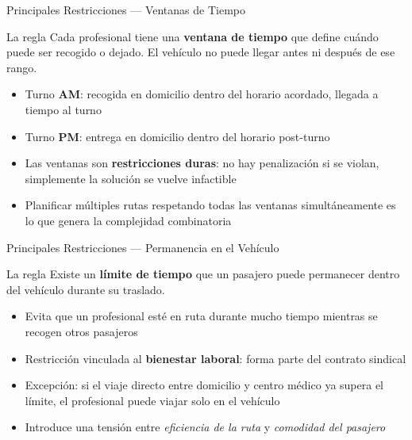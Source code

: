 \documentclass[10pt, aspectratio=169]{beamer}
\begin{document}
\begin{frame}{Principales Restricciones — Ventanas de Tiempo}

  \begin{block}{La regla}
    Cada profesional tiene una \textbf{ventana de tiempo} que define cuándo puede ser recogido o dejado. El vehículo no puede llegar antes ni después de ese rango.
  \end{block}

  \vspace{10pt}
  \begin{itemize}\setlength\itemsep{10pt}
    \item Turno \textcolor{verdeok}{\bfseries AM}: recogida en domicilio dentro del horario acordado, llegada a tiempo al turno
    \item Turno \textcolor{rojono}{\bfseries PM}: entrega en domicilio dentro del horario post-turno
    \item Las ventanas son \textbf{restricciones duras}: no hay penalización si se violan, simplemente la solución se vuelve infactible
    \item Planificar múltiples rutas respetando todas las ventanas simultáneamente es lo que genera la complejidad combinatoria
  \end{itemize}

\end{frame}

\begin{frame}{Principales Restricciones — Permanencia en el Vehículo}

  \begin{block}{La regla}
    Existe un \textbf{límite de tiempo} que un pasajero puede permanecer dentro del vehículo durante su traslado.
  \end{block}

  \vspace{10pt}
  \begin{itemize}\setlength\itemsep{10pt}
    \item Evita que un profesional esté en ruta durante mucho tiempo mientras se recogen otros pasajeros
    \item Restricción vinculada al \textbf{bienestar laboral}: forma parte del contrato sindical
    \item Excepción: si el viaje directo entre domicilio y centro médico ya supera el límite, el profesional puede viajar solo en el vehículo
    \item Introduce una tensión entre \textit{eficiencia de la ruta} y \textit{comodidad del pasajero}
  \end{itemize}

\end{frame}
\end{document}
